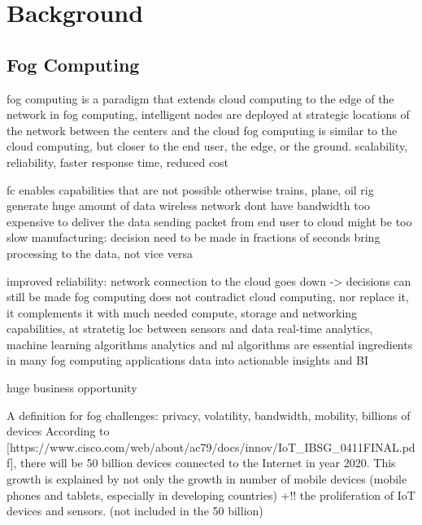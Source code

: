 \chapter{Background}
\label{chapter:background}


\section{Fog Computing}
\label{section:fog-computing}

fog computing is a paradigm that extends cloud computing to the edge of the network
in fog computing, intelligent nodes are deployed at strategic locations of the network between the centers and the cloud
fog computing is similar to the cloud computing, but closer to the end user, the edge, or the ground.
scalability, reliability, faster response time, reduced cost

fc enables capabilities that are not possible otherwise
trains, plane, oil rig generate huge amount of data
wireless network dont have bandwidth
too expensive to deliver the data
sending packet from end user to cloud might be too slow
manufacturing: decision need to be made in fractions of seconds
bring processing to the data, not vice versa

improved reliability:
network connection to the cloud goes down -> decisions can still be made
fog computing does not contradict cloud computing, nor replace it, it complements it with much needed compute, storage and networking capabilities, at stratetig loc between sensors and data
real-time analytics, machine learning algorithms
analytics and ml algorithms are essential ingredients in many fog computing applications
data into actionable insights and BI

huge business opportunity

A definition for fog
challenges: privacy, volatility, bandwidth, mobility, billions of devices
According to [https://www.cisco.com/web/about/ac79/docs/innov/IoT_IBSG_0411FINAL.pdf], there will be 50 billion devices connected to the Internet in year 2020.
This growth is explained by not only the growth in number of mobile devices (mobile phones and tablets, especially in developing countries)
+!! the proliferation of IoT devices and sensors. (not included in the 50 billion)

